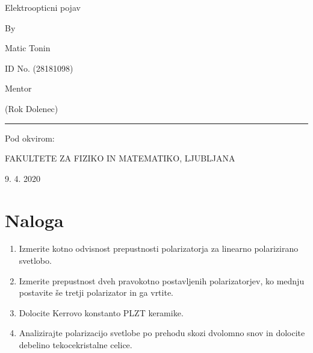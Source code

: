 \documentclass[11pt, a4paper]{article}
\theoremstyle{definition}
\theoremstyle{example}
\theoremstyle{izrek}
\begin{document}
\begin{center}
\thispagestyle{empty}
\parskip=14pt%
\vspace*{3\parskip}%
\begin{Huge} Elektroopticni pojav \end{Huge}

By

Matic Tonin

ID No. (28181098)

Mentor 

(Rok Dolenec)

\rule{7cm}{0.4pt}

Pod okvirom:

FAKULTETE ZA FIZIKO IN MATEMATIKO, LJUBLJANA

9. 4. 2020

\end{center}
\pagebreak
\section{Naloga}
\begin{enumerate}
\item Izmerite kotno odvisnost prepustnosti polarizatorja za linearno polarizirano svetlobo.
\item Izmerite prepustnost dveh pravokotno postavljenih polarizatorjev, ko mednju postavite
še tretji polarizator in ga vrtite.
\item Dolocite Kerrovo konstanto PLZT keramike.
\item Analizirajte polarizacijo svetlobe po prehodu skozi dvolomno snov in dolocite debelino
tekocekristalne celice.
\end{enumerate}
\end{document}
